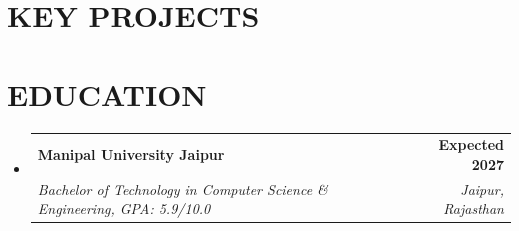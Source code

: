 \documentclass[letterpaper,11pt]{article}
\makeatletter
\newcommand{\customItem}[1]{
  \item\small{
    {#1 \vspace{-2pt}}
  }
}
\newcommand{\customSubHeading}[4]{
  \vspace{-2pt}\item
    \begin{tabular*}{1.0\textwidth}[t]{l@{\extracolsep{\fill}}r}
      \textbf{#1} & \textbf{\small #2} \\
      \textit{\small#3} & \textit{\small #4} \\
    \end{tabular*}\vspace{-7pt}
}
\newcommand{\customSubHeadingContentStart}{\begin{itemize}[leftmargin=0.0in, label={}]}
\newcommand{\customSubHeadingContentEnd}{\end{itemize}}
\makeatother
\begin{document}
%
%
%     

\section{KEY PROJECTS}
	\vspace{-5pt}
	\customSubHeadingContentStart
	\customSubHeadingContentEnd
\vspace{3pt}

\section{EDUCATION}
  \customSubHeadingContentStart
 \customSubHeading
      {Manipal University Jaipur}{Expected 2027}
      {Bachelor of Technology in Computer Science \& Engineering, GPA: 5.9/10.0} {Jaipur, Rajasthan}
  \customSubHeadingContentEnd
\vspace{-8pt}
\end{document}
